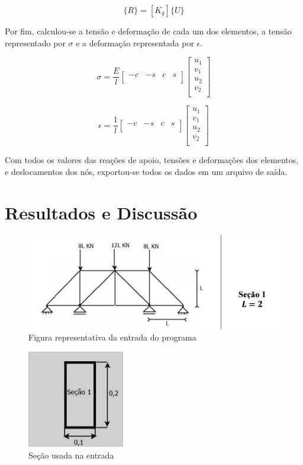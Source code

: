 \documentclass[paper=a4, fontsize=11pt]{scrartcl}
\begin{document}
\[\{R\} = [K_g] \{U\}\]

Por fim, calculou-se a tensão e deformação de cada um dos elementos, a tensão representado por \(\sigma\) e a deformação representada por \(\epsilon\).

\[\sigma = \frac{E}{l}  
\begin{bmatrix}
-c & -s & c & s\\
\end{bmatrix}
\begin{bmatrix}
u_1 \\
v_1 \\
u_2 \\
v_2 \\
\end{bmatrix}
\]


\[\epsilon = \frac{1}{l}  
\begin{bmatrix}
-c & -s & c & s\\
\end{bmatrix}
\begin{bmatrix}
u_1 \\
v_1 \\
u_2 \\
v_2 \\
\end{bmatrix}
\]

Com todos os valores das reações de apoio, tensões e deformações dos elementos, e deslocamentos dos nós, exportou-se todos os dados em um arquivo de saída.

\section{Resultados e Discussão}


\begin{figure}[!htb]
	\centering
	\includegraphics{trelica_entrada.png}
	\caption{Figura representativa da entrada do programa}
	\label{Rotulo}
\end{figure}

\begin{figure}[!htb]
	\centering
	\includegraphics{secao1.png}
	\caption{Seção usada na entrada}
	\label{Rotulo}
\end{figure}
\end{document}
